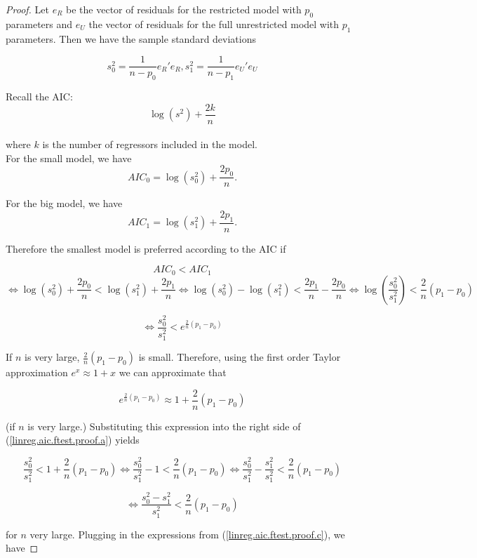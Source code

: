 \begin{proof}

Let \(e_R\) be the vector of residuals for the restricted model with \(p_0\) parameters and \(e_U\) the vector of residuals for the full unrestricted model with \(p_1\) parameters. Then we have the sample standard deviations

\begin{equation}\label{linreg.aic.ftest.proof.c}
 s_0^2 = \frac{1}{n-p_0}{e_R}'e_R, s_1^2 = \frac{1}{n-p_1}{e_U}' e_U
\end{equation}


Recall the  AIC: \[ \log(s^2) + \frac{2k}{n} \]
 \\
 where \(k\) is the number of regressors included in the model.
 \\
    
For the small model, we have \[ AIC_0 = \log(s_0^2) + \frac{2p_0}{n} .\]
    
For the big model, we have \[AIC_1 = \log(s_1^2) + \frac{2p_1}{n}. \]

Therefore the smallest model is preferred according to the AIC if
   
\[
AIC_0 < AIC_1
\]
\[
\iff \log(s_0^2) + \frac{2p_0}{n} < \log(s_1^2) + \frac{2p_1}{n} \iff \log(s_0^2) - \log(s_1^2) < \frac{2p_1}{n} - \frac{2p_0}{n} \iff \log( \frac{s_0^2}{s_1^2}) < \frac{2}{n}(p_1 - p_0)
\]


\begin{equation}\label{linreg.aic.ftest.proof.a}
\iff \frac{s_0^2}{s_1^2} < e^{\frac{2}{n}(p_1 - p_0)}
\end{equation}

If \(n\) is very large, \(\frac{2}{n}(p_1 - p_0)\) is small. Therefore, using the first order Taylor approximation \(e^x \approx 1 + x\) we can approximate that

\[
e^{\frac{2}{n}(p_1 - p_0)} \approx 1 + \frac{2}{n}(p_1 - p_0)
\]

(if \(n\) is very large.) Substituting this expression into the right side of (\ref{linreg.aic.ftest.proof.a}) yields

\[
\frac{s_0^2}{s_1^2} < 1 + \frac{2}{n}(p_1 - p_0) \iff \frac{s_0^2}{s_1^2} - 1 < \frac{2}{n}(p_1 - p_0) \iff \frac{s_0^2}{s_1^2} - \frac{s_1^2}{s_1^2} < \frac{2}{n}(p_1 - p_0)
\]

\[
\iff \frac{s_0^2 - s_1^2}{s_1^2} < \frac{2}{n}(p_1 - p_0)
\]

for \(n\) very large. Plugging in the expressions from (\ref{linreg.aic.ftest.proof.c}), we have


\end{proof}
